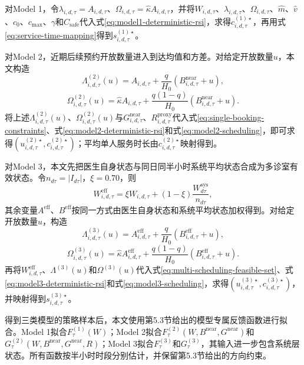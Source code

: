 \documentclass[a4paper,zihao=-4]{ctexart}
\numberwithin{figure}{section}
\numberwithin{table}{section}
\begin{document}
对Model 1，令$\lambda_{i,d,\tau}=A_{i,d,\tau}$、$\Omega_{i,d,\tau}=\hat\kappa A_{i,d,\tau}$，并将$W_{i,d,\tau}$、$\lambda_{i,d,\tau}$、$\Omega_{i,d,\tau}$、$\hat m$、$\hat v$、$c_0$、$c_{\max}$、$\gamma$和$C_{\mathrm{safe}}$代入式\eqref{eq:model1-deterministic-rsi}，求得$c_{i,d,\tau}^{(1)\star}$，再用式\eqref{eq:service-time-mapping}得到$s_{i,d,\tau}^{(1)\star}$。

对Model 2，近期后续预约开放数量进入到达均值和方差。对给定开放数量$u$，本文构造
\begin{equation}
\Lambda_{i,d,\tau}^{(2)}(u)
=A_{i,d,\tau}+\frac{q}{H_0}
\left(B_{i,d,\tau}^{\mathrm{near}}+u\right),
\end{equation}
\begin{equation}
\Omega_{i,d,\tau}^{(2)}(u)
=\hat\kappa A_{i,d,\tau}
+\frac{q(1-q)}{H_0}
\left(B_{i,d,\tau}^{\mathrm{near}}+u\right).
\end{equation}
将上述$\Lambda_{i,d,\tau}^{(2)}(u)$、$\Omega_{i,d,\tau}^{(2)}(u)$与$G_{i,d,\tau}^{\mathrm{near}}$、$R_{i,d,\tau}^{\mathrm{proxy}}$代入式\eqref{eq:single-booking-constraints}、式\eqref{eq:model2-deterministic-rsi}和式\eqref{eq:model2-scheduling}，即可求得$(u_{i,d,\tau}^{(2)\star},c_{i,d,\tau}^{(2)\star})$；平均单人服务时长由$c_{i,d,\tau}^{(2)\star}$映射得到。

对Model 3，本文先把医生自身状态与同日同半小时系统平均状态合成为多诊室有效状态。令$n_{d\tau}=|I_{d\tau}|$，$\xi=0.70$，则
\begin{equation}
W_{i,d,\tau}^{\mathrm{eff}}
=\xi W_{i,d,\tau}+(1-\xi)\frac{W_{d\tau}^{\mathrm{sys}}}{n_{d\tau}},
\end{equation}
其余变量$A^{\mathrm{eff}}$、$B^{\mathrm{eff}}$按同一方式由医生自身状态和系统平均状态加权得到。对给定开放数量$u$，构造
\begin{equation}
\Lambda_{i,d,\tau}^{(3)}(u)
=A_{i,d,\tau}^{\mathrm{eff}}+\frac{q}{H_0}
\left(B_{i,d,\tau}^{\mathrm{eff}}+u\right),
\end{equation}
\begin{equation}
\Omega_{i,d,\tau}^{(3)}(u)
=\hat\kappa A_{i,d,\tau}^{\mathrm{eff}}
+\frac{q(1-q)}{H_0}
\left(B_{i,d,\tau}^{\mathrm{eff}}+u\right).
\end{equation}
再将$W_{i,d,\tau}^{\mathrm{eff}}$、$\Lambda^{(3)}(u)$和$\Omega^{(3)}(u)$代入式\eqref{eq:multi-scheduling-feasible-set}、式\eqref{eq:model3-deterministic-rsi}和式\eqref{eq:model3-scheduling}，求得$(u_{i,d,\tau}^{(3)\star},c_{i,d,\tau}^{(3)\star})$，并映射得到$s_{i,d,\tau}^{(3)\star}$。

得到三类模型的策略样本后，本文使用第5.3节给出的模型专属反馈函数进行拟合。Model 1拟合$F_\tau^{(1)}(W)$；Model 2拟合$F_\tau^{(2)}(W,B^{\mathrm{near}},G^{\mathrm{near}})$和$G_\tau^{(2)}(W,B^{\mathrm{near}},G^{\mathrm{near}},R)$；Model 3拟合$F_\tau^{(3)}$和$G_\tau^{(3)}$，其输入进一步包含系统层状态。所有函数按半小时时段分别估计，并保留第5.3节给出的方向约束。
\end{document}
